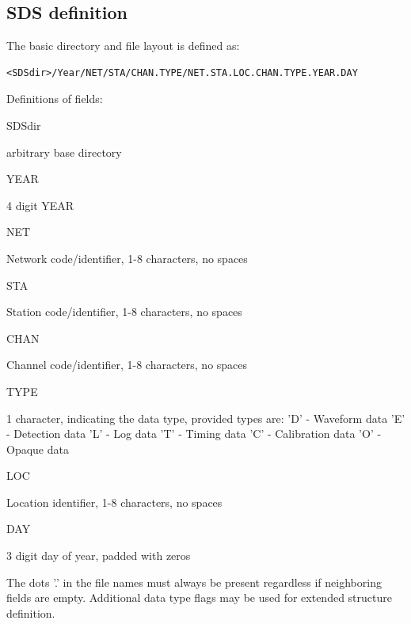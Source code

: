 \documentclass[11pt,a4paper,titlepage]{article}
\begin{document}
\subsection{SDS definition}

The basic directory and file layout is defined as:
\begin{verbatim}
<SDSdir>/Year/NET/STA/CHAN.TYPE/NET.STA.LOC.CHAN.TYPE.YEAR.DAY
\end{verbatim}

Definitions of fields:
\begin{interface}

\item SDSdir

arbitrary base directory

\item YEAR

4 digit YEAR

\item NET 

Network code/identifier, 1-8 characters, no spaces

\item STA

Station code/identifier, 1-8 characters, no spaces

\item CHAN

Channel code/identifier, 1-8 characters, no spaces

\item TYPE

1 character, indicating the data type, provided types are:
’D’ - Waveform data
’E’ - Detection data
’L’ - Log data
’T’ - Timing data
’C’ - Calibration data
’O’ - Opaque data

\item LOC

Location identifier, 1-8 characters, no spaces

\item DAY

3 digit day of year, padded with zeros

\end{interface}

The dots ’.’ in the file names must always be present regardless if neighboring fields are empty. Additional data type flags may be used for extended structure definition.


\end{document}
